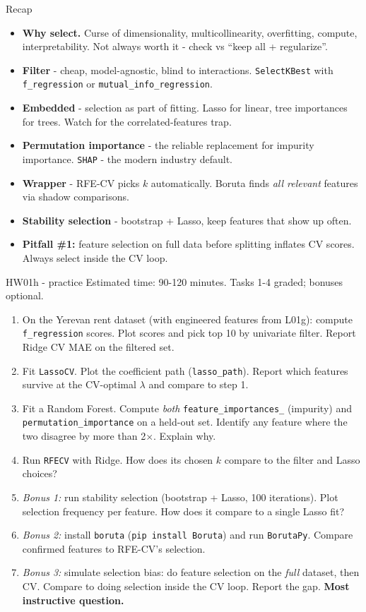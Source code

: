 \documentclass[aspectratio=169]{beamer}
\begin{document}
\begin{frame}{Recap}
  \begin{itemize}\small
    \item \textbf{Why select.} Curse of dimensionality, multicollinearity, overfitting, compute, interpretability. Not always worth it - check vs ``keep all + regularize''.
    \item \textbf{Filter} - cheap, model-agnostic, blind to interactions. \texttt{SelectKBest} with \texttt{f\_regression} or \texttt{mutual\_info\_regression}.
    \item \textbf{Embedded} - selection as part of fitting. Lasso for linear, tree importances for trees. Watch for the correlated-features trap.
    \item \textbf{Permutation importance} - the reliable replacement for impurity importance. \texttt{SHAP} - the modern industry default.
    \item \textbf{Wrapper} - RFE-CV picks $k$ automatically. Boruta finds \emph{all relevant} features via shadow comparisons.
    \item \textbf{Stability selection} - bootstrap + Lasso, keep features that show up often.
    \item \textbf{Pitfall \#1:} feature selection on full data before splitting inflates CV scores. Always select inside the CV loop.
  \end{itemize}
\end{frame}

\begin{frame}{HW01h - practice}
  \footnotesize Estimated time: 90-120 minutes. Tasks 1-4 graded; bonuses optional.
  \begin{enumerate}\small
    \item On the Yerevan rent dataset (with engineered features from L01g): compute \texttt{f\_regression} scores. Plot scores and pick top 10 by univariate filter. Report Ridge CV MAE on the filtered set.
    \item Fit \texttt{LassoCV}. Plot the coefficient path (\texttt{lasso\_path}). Report which features survive at the CV-optimal $\lambda$ and compare to step 1.
    \item Fit a Random Forest. Compute \emph{both} \texttt{feature\_importances\_} (impurity) and \texttt{permutation\_importance} on a held-out set. Identify any feature where the two disagree by more than 2$\times$. Explain why.
    \item Run \texttt{RFECV} with Ridge. How does its chosen $k$ compare to the filter and Lasso choices?
    \item \emph{Bonus 1:} run stability selection (bootstrap + Lasso, 100 iterations). Plot selection frequency per feature. How does it compare to a single Lasso fit?
    \item \emph{Bonus 2:} install \texttt{boruta} (\texttt{pip install Boruta}) and run \texttt{BorutaPy}. Compare confirmed features to RFE-CV's selection.
    \item \emph{Bonus 3:} simulate selection bias: do feature selection on the \emph{full} dataset, then CV. Compare to doing selection inside the CV loop. Report the gap. \textbf{Most instructive question.}
  \end{enumerate}
\end{frame}
\end{document}
